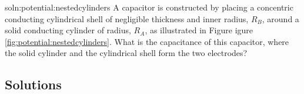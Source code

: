 \begin{problem}{soln:potential:nestedcylinders}{\label{prob:potential:nestedcylinders} A capacitor is constructed by placing a concentric conducting cylindrical shell of negligible thickness and inner radius, $R_B$, around a solid conducting cylinder of radius, $R_A$, as illustrated in Figure igure \ref{fig:potential:nestedcylinders}. What is the capacitance of this capacitor, where the solid cylinder and the cylindrical shell form the two electrodes?
}
\end{problem}

\newpage
\subsection{Solutions}
